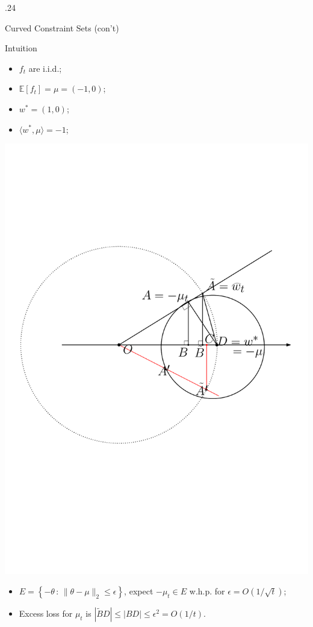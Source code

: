 \documentclass[final]{beamer} %
\newcommand{\Exp}[1]{\mathbb{E}\left[ #1 \right]}
\newcommand{\ip}[1]{\langle#1\rangle}
\newcommand{\set}[2]{\left\{#1 \,:\, #2 \right\}}
\begin{document}
\begin{frame}[c]
\begin{columns}[t,totalwidth=\textwidth]
\begin{column} {.24\textwidth}
\begin{block}{Curved Constraint Sets (con't)}
\begin{minipage}{0.95\textwidth}
\begin{block}{Intuition}
\begin{minipage}[b]{0.55\textwidth}
\begin{itemize}
							\item $f_t$ are i.i.d.;
							\item $\Exp{f_t} = \mu = (-1,0)$;
							\item $w^* = (1,0)$;
							\item $\ip{w^*,\mu} = -1$;
						\end{itemize}
						\end{minipage}
						\begin{minipage}[b]{0.37\textwidth}
						{\includegraphics[width=\textwidth, trim={6.2cm 6cm 2cm 0},clip]{figures/ExcessError}}
						\end{minipage}
					
						\begin{itemize}
							\item $E = \set{-\theta}{\|\theta - \mu\|_2 \le \epsilon}$, expect $-\mu_t \in E$ w.h.p. for $\epsilon=O(1/\sqrt{t})$;
							\item Excess loss for $\mu_t$ is $|\tilde{B}D| \le |BD| \le \epsilon^2 = O(1/t)$.
						\end{itemize}
				\end{block}
			\end{minipage}
			

\end{block}
\end{column}
\end{columns}
\end{frame}
\end{document}
